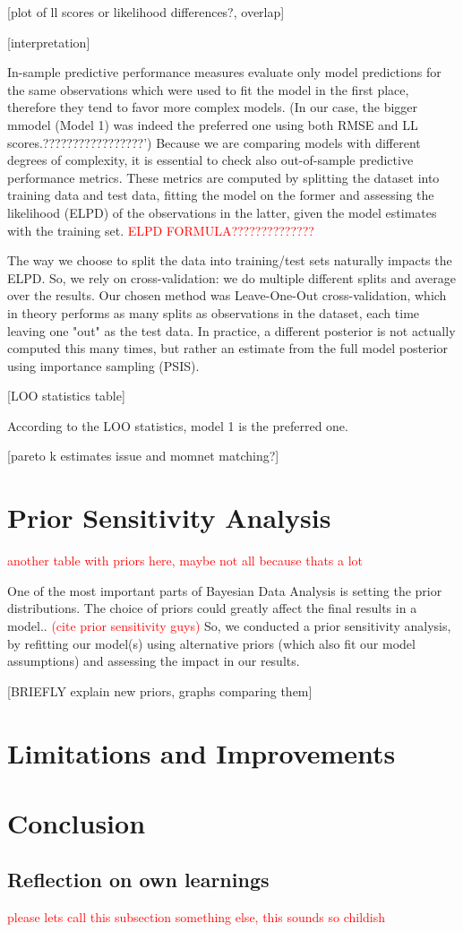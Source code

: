 \documentclass[12pt]{article}
\begin{document}
[plot of ll scores or likelihood differences?, overlap]

[interpretation]



In-sample predictive performance measures evaluate only model predictions for the same observations which were used to fit the model in the first place, therefore they tend to favor more complex models.
(In our case, the bigger mmodel (Model 1) was indeed the preferred one using both RMSE and LL scores.?????????????????')
Because we are comparing models with different degrees of complexity, it is essential to check also out-of-sample predictive performance metrics. These metrics are computed by splitting the dataset into training data and test data, fitting the model on the former and assessing the likelihood (ELPD) of the observations in the latter, given the model estimates with the training set.
\textcolor{red}{ELPD FORMULA??????????????}

The way we choose to split the data into training/test sets naturally impacts the ELPD. So, we rely on cross-validation: we do multiple different splits and average over the results. Our chosen method was Leave-One-Out cross-validation, which in theory performs as many splits as observations in the dataset, each time leaving one "out" as the test data. In practice, a different posterior is not actually computed this many times, but rather an estimate from the full model posterior using importance sampling (PSIS).

[LOO statistics table]

According to the LOO statistics, model 1 is the preferred one.

[pareto k estimates issue and momnet matching?]


\section{Prior Sensitivity Analysis}

\textcolor{red}{another table with priors here, maybe not all because thats a lot}

One of the most important parts of Bayesian Data Analysis is setting the prior distributions. The choice of priors could greatly affect the final results in a model..  \textcolor{red}{(cite prior sensitivity guys)}
So, we conducted a prior sensitivity analysis, by refitting our model(s) using alternative priors (which also fit our model assumptions) and assessing the impact in our results.

[BRIEFLY explain new priors, graphs comparing them]



\section{Limitations and Improvements}


\section{Conclusion}

\subsection{Reflection on own learnings}

\textcolor{red}{please lets call this subsection something else, this sounds so childish}


\printbibliography
\end{document}
